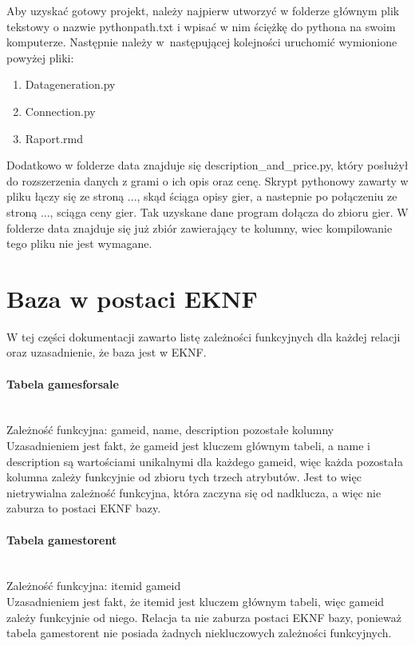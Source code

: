 \documentclass{article}
\begin{document}
	
	\noindent Aby uzyskać gotowy projekt, należy najpierw utworzyć w folderze głównym plik tekstowy o nazwie python\textunderscore path.txt i wpisać w nim ściężkę do pythona na swoim komputerze. Następnie należy w~następującej kolejności uruchomić wymionione powyżej pliki:
	\begin{enumerate}
		\setlength{\itemsep}{-2pt}
		\item Data\textunderscore generation.py
		\item Connection.py
		\item Raport.rmd
	\end{enumerate}

	Dodatkowo w folderze data znajduje się description_and_price.py, który posłużył do rozszerzenia danych z grami o ich opis oraz cenę. Skrypt pythonowy zawarty w pliku łączy się ze stroną ..., skąd ściąga opisy gier, a nastepnie po połączeniu ze stroną ..., sciąga ceny gier. Tak uzyskane dane program dołącza do zbioru gier. W folderze data znajduje się już zbiór zawierający te kolumny, wiec kompilowanie tego pliku nie jest wymagane.
	
	\section{Baza w postaci EKNF}
	W tej części dokumentacji zawarto listę zależności funkcyjnych dla każdej relacji oraz uzasadnienie, że baza jest w EKNF.
	
	\paragraph{Tabela games\textunderscore for\textunderscore sale}\mbox{}\vspace{0.2cm} \\
	Zależność funkcyjna: \textbraceleft game\textunderscore id, name, description\textbraceright \mbox{} \textrightarrow \mbox{} pozostałe kolumny \vspace{0.2cm} \\
	\noindent Uzasadnieniem jest fakt, że game\textunderscore id jest kluczem głównym tabeli, a name i description są wartościami unikalnymi dla każdego game\textunderscore id, więc każda pozostała kolumna zależy funkcyjnie od zbioru tych trzech atrybutów. Jest to więc nietrywialna zależność funkcyjna, która zaczyna się od nadklucza, a więc nie zaburza to postaci EKNF bazy.

	\paragraph{Tabela games\textunderscore to\textunderscore rent}\mbox{}\vspace{0.2cm} \\
	Zależność funkcyjna: item\textunderscore id\mbox{} \textrightarrow \mbox{} game\textunderscore id \vspace{0.2cm} \\
	\noindent Uzasadnieniem jest fakt, że item\textunderscore id jest kluczem głównym tabeli, więc game\textunderscore id zależy funkcyjnie od niego. Relacja ta nie zaburza postaci EKNF bazy, ponieważ tabela games\textunderscore to\textunderscore rent nie posiada żadnych niekluczowych zależności funkcyjnych.
	
\end{document}
